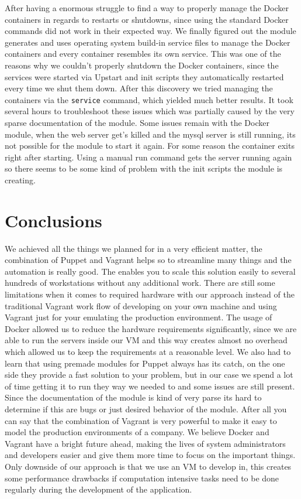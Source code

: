 After having a enormous struggle to find a way to properly manage the Docker containers in regards to restarts or shutdowns, since using the standard Docker commands did not work in their expected way. We finally figured out the module generates and uses operating system build-in service files to manage the Docker containers and every container resembles its own service. This was one of the reasons why we couldn't properly shutdown the Docker containers, since the services were started via Upstart and init scripts they automatically restarted every time we shut them down. After this discovery we tried managing the containers via the \verb|service| command, which yielded much better results. It took several hours to troubleshoot these issues which was partially caused by the very sparse documentation of the module. Some issues remain with the Docker module, when the web server get's killed and the mysql server is still running, its not possible for the module to start it again. For some reason the container exits right after starting. Using a manual run command gets the server running again so there seems to be some kind of problem with the init scripts the module is creating.




\section{Conclusions}

We achieved all the things we planned for in a very efficient matter, the combination of Puppet and Vagrant helps so to streamline many things and the automation is really good. The enables you to scale this solution easily to several hundreds of workstations without any additional work. There are still some limitations when it comes to required hardware with our approach instead of the traditional Vagrant work flow of developing on your own machine and using Vagrant just for your emulating the production environment. The usage of Docker allowed us to reduce the hardware requirements significantly, since we are able to run the servers inside our \gls{VM} and this way creates almost no overhead which allowed us to keep the requirements at a reasonable level. We also had to learn that using premade modules for Puppet always has its catch, on the one side they provide a fast solution to your problem, but in our case we spend a lot of time getting it to run they way we needed to and some issues are still present. Since the documentation of the module is kind of very parse its hard to determine if this are bugs or just desired behavior of the module. 
After all you can say that the combination of Vagrant is very powerful to make it easy to model the production environments of a company. We believe Docker and Vagrant have a bright future ahead, making the lives of system administrators and developers easier and give them more time to focus on the important things. Only downside of our approach is that we use an \gls{VM} to develop in, this creates some performance drawbacks if computation intensive tasks need to be done regularly during the development of the application.

